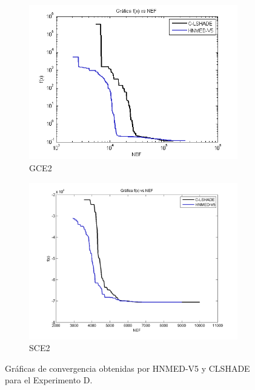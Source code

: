 \begin{figure}
\begin{subfigure}[b]{0.49\linewidth}
		\includegraphics[width=\linewidth]{Figures/D-Grafica_Convergencia_Problema_5}
		\caption{GCE2} \label{fig:G2} 
	\end{subfigure}
	\begin{subfigure}[b]{0.49\linewidth}
		\includegraphics[width=\linewidth]{Figures/D-Grafica_Convergencia_Problema_6}
		\caption{SCE2} \label{fig:S1} 
	\end{subfigure}
	\caption{Gráficas de convergencia obtenidas por HNMED-V5 y CLSHADE para el Experimento D.} \label{fig: Gráficas de convergencia obtenidas por HNMED-V5 y CLSHADE para el Experimento D} 
	
\end{figure}

